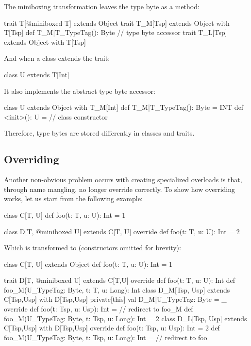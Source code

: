 The miniboxing transformation leaves the type byte as a method:

\begin{lstlisting-nobreak}
trait T[@miniboxed T] extends Object
trait T_M[Tsp] extends Object with T[Tsp] {
  def T_M|T_TypeTag(): Byte // type byte accessor
}
trait T_L[Tsp] extends Object with T[Tsp]
\end{lstlisting-nobreak}

And when a class extends the trait:

\begin{lstlisting-nobreak}
class U extends T[Int]
\end{lstlisting-nobreak}

It also implements the abstract type byte accessor:

\begin{lstlisting-nobreak}
class U extends Object with T_M[Int] {
  def T_M|T_TypeTag(): Byte = INT
  def <init>(): U = // class constructor
}
\end{lstlisting-nobreak}

Therefore, type bytes are stored differently in classes and traits.

\subsection{Overriding}

Another non-obvious problem occurs with creating specialized overloads is that, through name mangling, no longer override correctly.
To show how overriding works, let us start from the following example:

\begin{lstlisting-nobreak}
class C[T, U] {
  def foo(t: T, u: U): Int = 1
}

class D[T, @miniboxed U] extends C[T, U] {
  override def foo(t: T, u: U): Int = 2
}
\end{lstlisting-nobreak}

Which is transformed to (constructors omitted for brevity):

\begin{lstlisting-nobreak}
class C[T, U] extends Object {
  def foo(t: T, u: U): Int = 1
}

trait D[T, @miniboxed U] extends C[T,U] {
  override def foo(t: T, u: U): Int
  def foo_M(U_TypeTag: Byte, t: T, u: Long): Int
}
class D_M[Tsp, Usp] extends C[Tsp,Usp] with D[Tsp,Usp] {
  private[this] val D_M|U_TypeTag: Byte = _
  override def foo(t: Tsp, u: Usp): Int = // redirect to foo_M
  def foo_M(U_TypeTag: Byte, t: Tsp, u: Long): Int = 2
}
class D_L[Tsp, Usp] extends C[Tsp,Usp] with D[Tsp,Usp] {
  override def foo(t: Tsp, u: Usp): Int = 2
  def foo_M(U_TypeTag: Byte, t: Tsp, u: Long): Int = // redirect to foo
}
\end{lstlisting-nobreak}

